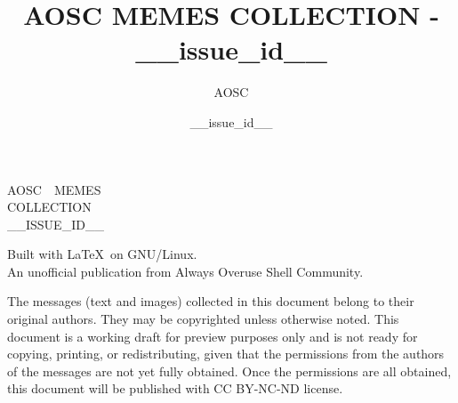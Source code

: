 \documentclass[10pt,a4paper]{report}
\title{AOSC MEMES COLLECTION - __issue_id__}
\author{AOSC}
\date{__issue_id__}
\begin{document}
\begin{titlepage}
	\leavevmode
	\vskip 50mm
	\begin{center}
        \rmfamily{}
		\parbox{75mm}{
            \center\rmfamily{}\Huge\baselineskip=40pt
            A\hfill O\hfill S\hfill C~~\hfill M\hfill E\hfill M\hfill E\hfill S\\
            C\hfill O\hfill L\hfill L\hfill E\hfill C\hfill T\hfill I\hfill O\hfill N\\
            \MakeUppercase{__issue_id__}
        }\par
		\vfill
        \sffamily
		\normalsize
        Built with \LaTeX~on GNU/Linux.\\
        An unofficial publication from Always Overuse Shell Community.
	\end{center}
\end{titlepage}




\begin{multicols*}{2}
	
\end{multicols*}




\clearpage
\leavevmode
\vfill
\small
\sffamily
The messages (text and images) collected in this document belong to their original authors.
They may be copyrighted unless otherwise noted.
This document is a working draft for preview purposes only and is not ready for copying, printing, or redistributing,
given that the permissions from the authors of the messages are not yet fully obtained.
Once the permissions are all obtained, this document will be published with CC BY-NC-ND license.
\end{document}
